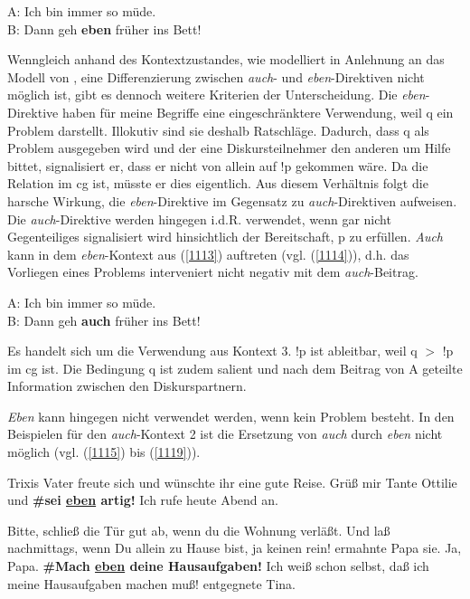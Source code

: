 {\begin{exe}
	\ex\label{1113} 
	A: Ich bin immer so müde.\\
	B: Dann geh \textbf{eben} früher ins Bett!
\end{exe}
Wenngleich anhand des Kontextzustandes, wie modelliert in Anlehnung an das Modell von \citet{Farkas2010}, eine Differenzierung zwischen \textit{auch}- und \textit{eben}-Direktiven nicht möglich ist, gibt es dennoch weitere Kriterien der Unterscheidung. Die \textit{eben}-Direktive haben für meine Begriffe eine eingeschränktere Verwendung, weil q ein Problem darstellt. Illokutiv sind sie deshalb  Ratschläge. Dadurch, dass q als Problem ausgegeben wird und der eine Diskursteilnehmer den anderen um Hilfe bittet, signalisiert er, dass er nicht von allein auf !p gekommen wäre. Da die Relation im cg ist, müsste er dies eigentlich. Aus diesem Verhältnis folgt die harsche Wirkung, die \textit{eben}-Direktive im Gegensatz zu \textit{auch}-Direktiven aufweisen. Die \textit{auch}-Direktive werden hingegen i.d.R. verwendet, wenn gar nicht Gegenteiliges signalisiert wird hinsichtlich der Bereitschaft, p zu erfüllen. 							
\textit{Auch} kann in dem \textit{eben}-Kontext aus (\ref{1113}) auftreten (vgl. (\ref{1114})), d.h. das Vorliegen eines Problems interveniert nicht negativ mit dem \textit{auch}-Beitrag.

\begin{exe}
	\ex\label{1114} 
	A: Ich bin immer so müde.\\
	B: Dann geh \textbf{auch} früher ins Bett!
\end{exe}
Es handelt sich um die Verwendung aus Kontext 3. !p ist ableitbar, weil q $>$ !p im cg ist. Die Bedingung q ist zudem salient und nach dem Beitrag von A geteilte Information zwischen den Diskurspartnern.

\textit{Eben} kann hingegen nicht verwendet werden, wenn kein Problem besteht. In den Beispielen für den \textit{auch}-Kontext 2 ist die Ersetzung von \textit{auch} durch \textit{eben} nicht möglich (vgl. (\ref{1115}) bis (\ref{1119})).
	
\begin{exe}
	\ex\label{1115} 
	Trixis Vater freute sich und wünschte ihr eine gute Reise. \glqq Grüß  mir Tante Ottilie und \textbf{\#sei \underline{eben} artig!} Ich rufe heute 			Abend an.\grqq{}
\end{exe}	
	
\begin{exe}
	\ex\label{1116} 
	\scriptsize
	\glqq Bitte, schließ die Tür gut ab, wenn du die Wohnung verläßt. Und laß nachmittags, wenn Du allein zu Hause bist, ja keinen rein!\grqq{} ermahnte 		Papa sie.
	\glqq Ja, Papa.\grqq{}
	\glqq \textbf{\#Mach \underline{eben} deine Hausaufgaben!}\grqq{}
	\glqq Ich weiß schon selbst, daß ich meine Hausaufgaben machen muß!\grqq{} entgegnete Tina.
\end{exe}		

}
